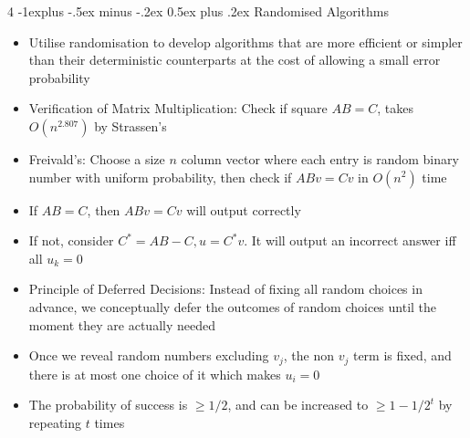 \documentclass[10pt, landscape]{article}
\makeatletter
\renewcommand{\section}{\@startsection{section}{1}{0mm}%
                                {-1ex plus -.5ex minus -.2ex}%
                                {0.5ex plus .2ex}%
                                {\normalfont\large\bfseries}}
\renewcommand{\section}{\@startsection{section}{2}{0mm}%
                                {-1explus -.5ex minus -.2ex}%
                                {0.5ex plus .2ex}%
                                {\normalfont\normalsize\bfseries}}
\makeatother
\begin{document}
\begin{multicols*}{4}
\section{Randomised Algorithms}
\begin{itemize}
    \item Utilise randomisation to develop algorithms that are more efficient or simpler than their deterministic counterparts at the cost of allowing a small error probability
    \item Verification of Matrix Multiplication: Check if square $AB=C$, takes $O(n^{2.807})$ by Strassen's
    \item Freivald's: Choose a size $n$ column vector where each entry is random binary number with uniform probability, then check if $ABv=Cv$ in $O(n^2)$ time
    \item If $AB=C$, then $ABv=Cv$ will output correctly
    \item If not, consider $C^*=AB-C, u=C^*v$. It will output an incorrect answer iff all $u_k=0$
    \item Principle of Deferred Decisions: Instead of fixing all random choices in advance, we conceptually defer the outcomes of random choices until the moment they are actually needed
    \item Once we reveal random numbers excluding $v_j$, the non $v_j$ term is fixed, and there is at most one choice of it which makes $u_i=0$
    \item The probability of success is $\geq 1/2$, and can be increased to $\geq 1-1/2^t$ by repeating $t$ times
\end{itemize}


\end{multicols*}
\end{document}
